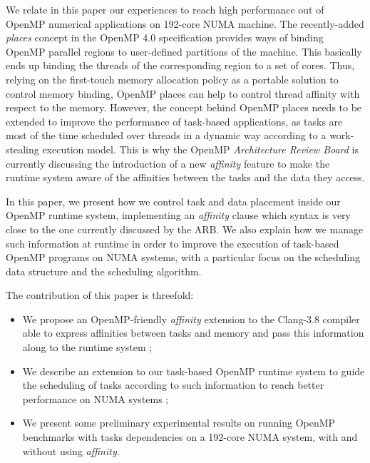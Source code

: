 \documentclass{Styles/llncs}
\begin{document}
 We relate in this paper our experiences to reach high performance out of OpenMP numerical applications on 192-core NUMA machine. The recently-added \emph{places} concept in the OpenMP 4.0 specification provides ways of binding OpenMP parallel regions to user-defined partitions of the machine. This basically ends up binding the threads of the corresponding region to a set of cores. Thus, relying on the first-touch memory allocation policy as a portable solution to control memory binding, OpenMP places can help to control thread affinity with respect to the memory.
However, the concept behind OpenMP places needs to be extended to improve the performance of task-based applications, as tasks are most of the time scheduled over threads in a dynamic way according to a work-stealing execution model.  This is why the OpenMP \emph{Architecture Review Board} is currently discussing the introduction of a new \textit{affinity} feature to make the runtime system aware of the affinities between the tasks and the data they access.

In this paper, we present how we control task and data placement inside our OpenMP runtime system, implementing an \emph{affinity} clause which syntax is very close to the one currently discussed by the ARB. We also explain how we manage such information at runtime in order to improve the execution of task-based OpenMP programs on NUMA systems, with a particular focus on the scheduling data structure and the scheduling algorithm.

The contribution of this paper is threefold:
\begin{itemize}
\item We propose an OpenMP-friendly \emph{affinity} extension to the Clang-3.8 compiler able to express affinities between tasks and memory and pass this information along to the runtime system ;
\item We describe an extension to our task-based OpenMP runtime system to guide the scheduling of tasks according to such information to reach better performance on NUMA systems ;
\item We present some preliminary experimental results on running OpenMP benchmarks with tasks dependencies on a 192-core NUMA system, with and without using \emph{affinity}.
\end{itemize}
\end{document}
